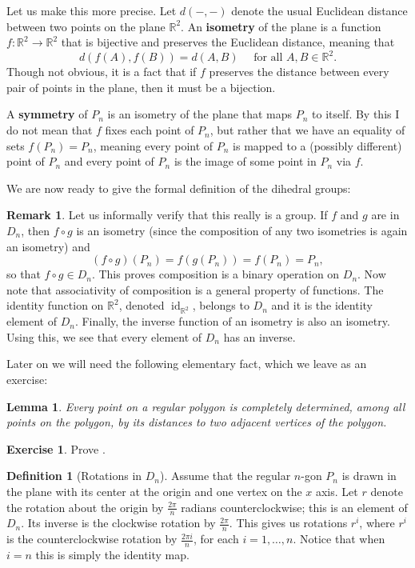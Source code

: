 \documentclass[12pt]{report}
\newtheorem{lemma}[theorem]{Lemma}
\numberwithin{equation}{section}
\numberwithin{theorem}{chapter}
\theoremstyle{definition}
\newtheorem{definition}[theorem]{Definition}
\newtheorem{exercise}{Exercise}
\newtheorem*{basic properties}{Basic Properties}
\newtheorem*{Important Remark}{Important Remark}
\newtheorem{remark}[theorem]{Remark}
\newcommand{\df}[1]{{\bf #1}\index{#1}}
\newcommand{\R}{\mathbb{R}}
\DeclareMathOperator{\id}{id}
\begin{document}
Let us make this more precise. Let $d(-,-)$ denote the usual Euclidean distance between two points on the plane $\R^2$. An \df{isometry} of the plane is a function $f\!: \R^2 \to \R^2$ that is bijective and preserves the Euclidean distance, meaning that
$$d(f(A),f(B))=d(A,B) \quad \textrm{ for all } A,B \in \R^2.$$
Though not obvious, it is a fact that if $f$ preserves the distance between every pair of points in the plane, then it must be a bijection. 

A \df{symmetry} of $P_n$ is an isometry of the plane that maps $P_n$ to itself. By this I do not mean that $f$ fixes each point of $P_n$, but rather that we have an equality of sets $f(P_n) = P_n$, meaning every point of $P_n$ is mapped to a (possibly different) point of $P_n$ and every point of $P_n$ is the image of some point in $P_n$ via $f$.

We are now ready to give the formal definition of the dihedral groups:



\begin{remark}
Let us informally verify that this really is a group.
If $f$ and $g$ are in $D_n$, then $f \circ g$ is an isometry (since the composition of any two isometries is again an isometry) and 
$$(f \circ g)(P_n) = f(g(P_n)) = f(P_n) = P_n,$$ 
so that $f \circ g \in D_n$. This proves composition is a binary operation on $D_n$. 
Now note that associativity of composition is a general property of functions.
The identity function on $\R^2$, denoted $\id_{\R^2}$, belongs to $D_n$ and it is the identity element of $D_n$.
Finally, the inverse function of an isometry is also an isometry. Using this, we see that every element of $D_n$ has an inverse.
\end{remark}


Later on we will need the following elementary fact, which we leave as an exercise:

\begin{lemma}\label{lemma polygon}
	Every point on a regular polygon is completely determined, among all points on the polygon, by its distances to two adjacent vertices of the polygon.
\end{lemma}


\begin{exercise}
	Prove .
\end{exercise}


\begin{definition}[Rotations in $D_n$]
	Assume that the regular $n$-gon $P_n$ is drawn in the plane with its center at the origin and one vertex on the $x$ axis. Let $r$ denote the rotation about the origin by $\frac{2\pi}{n}$ radians counterclockwise; this is an element of $D_n$. Its inverse is the clockwise rotation by $\frac{2 \pi}{n}$. This gives us rotations $r^i$, where $r^i$ is the counterclockwise rotation by $\frac{2 \pi i}{n}$, for each $i = 1, \ldots, n$. Notice that when $i=n$ this is simply the identity map.
\end{definition}
\end{document}
